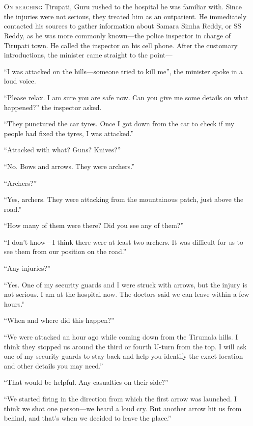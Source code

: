 \chapter{}

\lettrine{O}{n reaching} Tirupati, Guru rushed to the hospital he was familiar
with. Since the injuries were not serious, they treated him as an outpatient. He
immediately contacted his sources to gather information about Samara Simha Reddy, or SS
Reddy, as he was more commonly known—the police inspector in charge of Tirupati
town. He called the inspector on his cell phone. After the customary
introductions, the minister came straight to the point—

“I was attacked on the hills—someone tried to kill me”, the minister spoke in
a loud voice.

“Please relax. I am sure you are safe now. Can you give me some details on what
happened?” the inspector asked.

“They punctured the car tyres. Once I got down from the car to check if my
people had fixed the tyres, I was attacked.”

“Attacked with what? Guns? Knives?”

“No. Bows and arrows. They were archers.”

“Archers?”

“Yes, archers. They were attacking from the mountainous patch, just above the
road.”

“How many of them were there? Did you see any of them?”

“I don't know—I think there were at least two archers. It was difficult for us
to see them from our position on the road.”

“Any injuries?”

“Yes. One of my security guards and I were struck with arrows, but the injury is
not serious. I am at the hospital now. The doctors said we can leave within a
few hours.”

“When and where did this happen?”

“We were attacked an hour ago while coming down from the Tirumala hills. I
think they stopped us around the third or fourth U-turn from the top. I will ask
one of my security guards to stay back and help you identify the exact location
and other details you may need.”

“That would be helpful. Any casualties on their side?”

“We started firing in the direction from which the first arrow was launched. I
think we shot one person—we heard a loud cry. But another arrow hit us from
behind, and that's when we decided to leave the place.”

